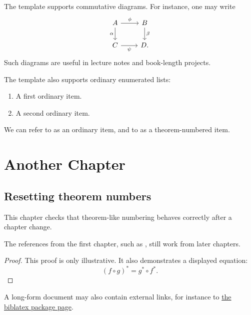 \documentclass[12pt,a4paper]{report}
\begin{document}
The template supports commutative diagrams. For instance, one may write
\[
    \begin{tikzcd}
        A \arrow[r, "\phi"] \arrow[d, "\alpha"'] &
        B \arrow[d, "\beta"] \\
        C \arrow[r, "\psi"'] &
        D .
    \end{tikzcd}
\]
Such diagrams are useful in lecture notes and book-length projects.

The template also supports ordinary enumerated lists:
\begin{enumerate}[label=(\alph*), ref=(\alph*)]
    \item A first ordinary item.
        \label{item:longform-ordinary-first} 
    \item A second ordinary item.
        \label{item:longform-ordinary-second} 
\end{enumerate}
We can refer to  as an ordinary item, and
to  as a theorem-numbered item.

\chapter{Another Chapter}

\section{Resetting theorem numbers}

This chapter checks that theorem-like numbering behaves correctly after a
chapter change.

\begin{lemma}
    \label{lemma:second-chapter}
    The references from the first chapter, such as
    , still work from later chapters.
\end{lemma}

\begin{proof}
    This proof is only illustrative. It also demonstrates a displayed equation:
    \begin{equation}
        \label{equation:pull-back}
        (f \circ g)^* = g^* \circ f^* .
    \end{equation}
\end{proof}

\begin{example}
    \label{example:external-link}
    A long-form document may also contain external links, for instance to
    \href{https://www.ctan.org/pkg/biblatex}{the biblatex package page}.
\end{example}

\printbibliography
\end{document}
